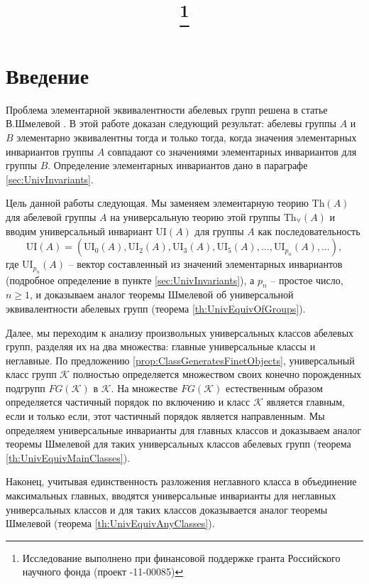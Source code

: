 \documentclass[a4paper,11pt,twoside]{article}
\title{\titles\footnote{Исследование выполнено при финансовой поддержке гранта Российского научного фонда (проект \textnumero14-11-00085)}}
\author{\authors}
\gdef\firstpage{1}
\def\K{{\mathcal{K}}}
\def\Th{{\mathrm{Th}}}
\def\Tha{{\mathrm{Th}_\forall}}
\def\ui{{\mathrm{UI}}}
\begin{document}
\maketitle

\tableofcontents
\listoftodos


\setcounter{page}{\firstpage}
\pagestyle{newpstyle}

\Russian
\sloppy
\rm


\section{Введение}

Проблема элементарной эквивалентности абелевых групп решена в статье В.Шмелевой \cite{Szm}. В этой работе доказан следующий результат: абелевы группы $A$ и $B$ элементарно эквивалентны тогда и только тогда, когда значения элементарных инвариантов группы $A$ совпадают со значениями элементарных инвариантов для группы $B$. Определение элементарных инвариантов дано в параграфе \ref{sec:UnivInvariants}.

Цель данной работы следующая. Мы заменяем элементарную теорию $\Th(A)$ для абелевой группы $A$ на универсальную теорию этой группы $\Tha(A)$ и вводим универсальный инвариант $\ui(A)$ для группы $A$ как последовательность 
$$\ui(A) = (\ui_0(A), \ui_2(A), \ui_3(A), \ui_5(A), \ldots, \ui_{p_n}(A), \ldots ),$$
где $\ui_{p_n}(A)$ -- вектор составленный из значений элементарных инвариантов (подробное определение в пункте \ref{sec:UnivInvariants}), а $p_n$ -- простое число, $n \geq 1$, и доказываем аналог теоремы Шмелевой об универсальной эквивалентности абелевых групп (теорема \ref{th:UnivEquivOfGroups}).

Далее, мы переходим к анализу произвольных универсальных классов абелевых групп, разделяя их на два множества: главные универсальные классы и неглавные. По предложению \ref{prop:ClassGeneratesFinetObjects}, универсальный класс групп $\K$ полностью определяется множеством своих конечно порожденных подгрупп $FG(\K)$ в $\K$. На множестве $FG(\K)$ естественным образом определяется частичный порядок по включению и класс $\K$ является главным, если и только если, этот частичный порядок является направленным. Мы определяем универсальные инварианты для главных классов и доказываем аналог теоремы Шмелевой для таких универсальных классов абелевых групп (теорема \ref{th:UnivEquivMainClasses}).

Наконец, учитывая единственность разложения неглавного класса в объединение максимальных главных, вводятся универсальные инварианты для неглавных универсальных классов и для таких классов доказывается аналог теоремы Шмелевой (теорема \ref{th:UnivEquivAnyClasses}).
\end{document}
